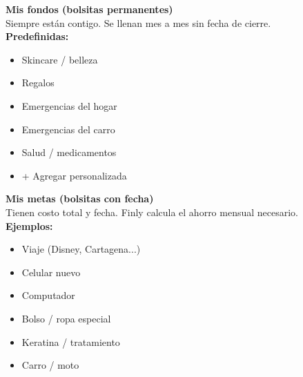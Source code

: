 \documentclass[a4paper,11pt]{article}
\begin{document}
\begin{mdframed}[backgroundcolor=cgreen!3,linecolor=cgreen!30,linewidth=1pt,roundcorner=6pt]
\begin{minipage}[t]{0.47\textwidth}
\textbf{\color{cdark!70}\small Mis fondos \textnormal{\scriptsize(bolsitas permanentes)}}\\[2pt]
\textcolor{cdark!60}{\scriptsize Siempre est\'an contigo. Se llenan mes a mes sin fecha de cierre.}\\[4pt]
\textbf{\color{cdark!60}\scriptsize Predefinidas:}
\begin{itemize}[leftmargin=*,itemsep=1pt,topsep=2pt]
  \item[\color{cgreen!60!black}$\bullet$] {\small Skincare / belleza}
  \item[\color{cgreen!60!black}$\bullet$] {\small Regalos}
  \item[\color{cgreen!60!black}$\bullet$] {\small Emergencias del hogar}
  \item[\color{cgreen!60!black}$\bullet$] {\small Emergencias del carro}
  \item[\color{cgreen!60!black}$\bullet$] {\small Salud / medicamentos}
  \item[\color{cgreen!60!black}$\bullet$] {\small + Agregar personalizada}
\end{itemize}
\end{minipage}
\hfill
\begin{minipage}[t]{0.47\textwidth}
\textbf{\color{cdark!70}\small Mis metas \textnormal{\scriptsize(bolsitas con fecha)}}\\[2pt]
\textcolor{cdark!60}{\scriptsize Tienen costo total y fecha. Finly calcula el ahorro mensual necesario.}\\[4pt]
\textbf{\color{cdark!60}\scriptsize Ejemplos:}
\begin{itemize}[leftmargin=*,itemsep=1pt,topsep=2pt]
  \item[\color{cgreen!60!black}$\bullet$] {\small Viaje (Disney, Cartagena...)}
  \item[\color{cgreen!60!black}$\bullet$] {\small Celular nuevo}
  \item[\color{cgreen!60!black}$\bullet$] {\small Computador}
  \item[\color{cgreen!60!black}$\bullet$] {\small Bolso / ropa especial}
  \item[\color{cgreen!60!black}$\bullet$] {\small Keratina / tratamiento}
  \item[\color{cgreen!60!black}$\bullet$] {\small Carro / moto}
\end{itemize}
\end{minipage}


\end{mdframed}
\end{document}
